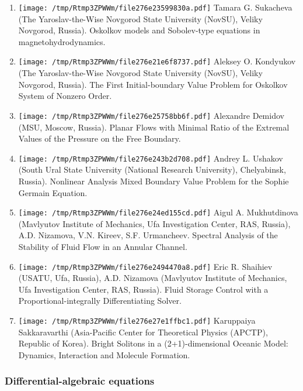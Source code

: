 \documentclass[
]{article}
\providecommand{\tightlist}{%
  \setlength{\itemsep}{0pt}\setlength{\parskip}{0pt}}
\begin{document}
\begin{enumerate}
\def\labelenumi{\arabic{enumi}.}
\tightlist
\item
  \protect\texttt{[image: /tmp/Rtmp3ZPWWm/file276e23599830a.pdf]}
  Tamara G. Sukacheva (The Yaroslav-the-Wise Novgorod State University
  (NovSU), Veliky Novgorod, Russia). Oskolkov models and Sobolev-type
  equations in magnetohydrodynamics.
\item
  \protect\texttt{[image: /tmp/Rtmp3ZPWWm/file276e21e6f8737.pdf]}
  Aleksey O. Kondyukov (The Yaroslav-the-Wise Novgorod State University
  (NovSU), Veliky Novgorod, Russia). The First Initial-boundary Value
  Problem for Oskolkov System of Nonzero Order.
\item
  \protect\texttt{[image: /tmp/Rtmp3ZPWWm/file276e25758bb6f.pdf]}
  Alexandre Demidov (MSU, Moscow, Russia). Planar Flows with Minimal
  Ratio of the Extremal Values of the Pressure on the Free Boundary.
\item
  \protect\texttt{[image: /tmp/Rtmp3ZPWWm/file276e243b2d708.pdf]}
  Andrey L. Ushakov (South Ural State University (National Research
  University), Chelyabinsk, Russia). Nonlinear Analysis Mixed Boundary
  Value Problem for the Sophie Germain Equation.
\item
  \protect\texttt{[image: /tmp/Rtmp3ZPWWm/file276e24ed155cd.pdf]}
  Aigul A. Mukhutdinova (Mavlyutov Institute of Mechanics, Ufa
  Investigation Center, RAS, Russia), A.D. Nizamova, V.N. Kireev, S.F.
  Urmancheev. Spectral Analysis of the Stability of Fluid Flow in an
  Annular Channel.
\item
  \protect\texttt{[image: /tmp/Rtmp3ZPWWm/file276e2494470a8.pdf]}
  Eric R. Shaihiev (USATU, Ufa, Russia), A.D. Nizamova (Mavlyutov
  Institute of Mechanics, Ufa Investigation Center, RAS, Russia). Fluid
  Storage Control with a Proportional-integrally Differentiating Solver.
\item
  \protect\texttt{[image: /tmp/Rtmp3ZPWWm/file276e27e1ffbc1.pdf]}
  Karuppaiya Sakkaravarthi (Asia-Pacific Center for Theoretical Physics
  (APCTP), Republic of Korea). Bright Solitons in a (2+1)-dimensional
  Oceanic Model: Dynamics, Interaction and Molecule Formation.
\end{enumerate}

\hypertarget{dae}{%
\subsubsection{Differential-algebraic equations}\label{dae}}
\end{document}
